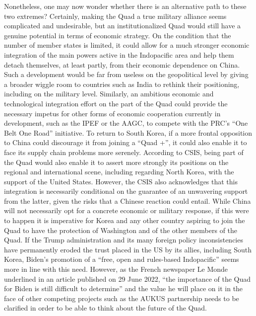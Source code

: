 \documentclass[11pt,a4paper]{article}
\begin{document}
Nonetheless, one may now wonder whether there is an alternative path to these two extremes? Certainly, making the Quad a true military alliance seems complicated and undesirable, but an institutionalized Quad would still have a genuine potential in terms of economic strategy. On the condition that the number of member states is limited, it could allow for a much stronger economic integration of the main powers active in the Indopacific area and help them detach themselves, at least partly, from their economic dependence on China. Such a development would be far from useless on the geopolitical level by giving a broader wiggle room to countries such as India to rethink their positioning, including on the military level. Similarly, an ambitious economic and technological integration effort on the part of the Quad could provide the necessary impetus for other forms of economic cooperation currently in development, such as the IPEF or the AAGC, to compete with the PRC’s “One Belt One Road” initiative. To return to South Korea, if a more frontal opposition to China could discourage it from joining a “Quad +”, it could also enable it to face its supply chain problems more serenely. According to CSIS, being part of the Quad would also enable it to assert more strongly its positions on the regional and international scene, including regarding North Korea, with the support of the United States. However, the CSIS also acknowledges that this integration is necessarily conditional on the guarantee of an unwavering support from the latter, given the risks that a Chinese reaction could entail. While China will not necessarily opt for a concrete economic or military response, if this were to happen it is imperative for Korea and any other country aspiring to join the Quad to have the protection of Washington and of the other members of the Quad. If the Trump administration and its many foreign policy inconsistencies have permanently eroded the trust placed in the US by its allies, including South Korea, Biden’s promotion of a “free, open and rules-based Indopacific” seems more in line with this need. However, as the French newspaper Le Monde underlined in an article published on 29 June 2022, “the importance of the Quad for Biden is still difficult to determine” and the value he will place on it in the face of other competing projects such as the AUKUS partnership needs to be clarified in order to be able to think about the future of the Quad.
\end{document}
